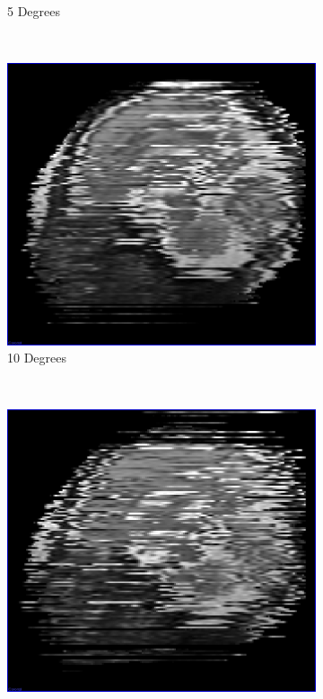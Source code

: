 \begin{figure}[H]
\begin{subfigure}[b]{0.32\textwidth}
    \caption{5 Degrees}\label{fig:scan_simulation_5_degrees}
  \end{subfigure}%
  ~ %
  \begin{subfigure}[b]{0.32\textwidth}
    \includegraphics[width=\textwidth]{images/scan_simulation/scan_simulation_10.png}
    \caption{10 Degrees}\label{fig:scan_simulation_10_degrees}
  \end{subfigure}
  ~ %
  \begin{subfigure}[b]{0.32\textwidth}
    \includegraphics[width=\textwidth]{images/scan_simulation/scan_simulation_20.png}

\end{subfigure}
\end{figure}
